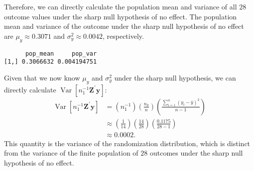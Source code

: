 \documentclass[
  12pt,
  leqno]{article}
\newenvironment{Shaded}{\begin{snugshade}}{\end{snugshade}}
\newcommand{\DecValTok}[1]{\textcolor[rgb]{0.00,0.00,0.81}{#1}}
\newcommand{\KeywordTok}[1]{\textcolor[rgb]{0.13,0.29,0.53}{\textbf{#1}}}
\newcommand{\NormalTok}[1]{#1}
\newcommand{\OperatorTok}[1]{\textcolor[rgb]{0.81,0.36,0.00}{\textbf{#1}}}
\newcommand{\StringTok}[1]{\textcolor[rgb]{0.31,0.60,0.02}{#1}}
\DeclareMathOperator{\Var}{\mathrm{Var}}
\DeclareMathOperator{\1}{\mathbbm{1}}
\begin{document}
Therefore, we can directly calculate the population mean and variance of
all \(28\) outcome values under the sharp null hypothesis of no effect.
The population mean and variance of the outcome under the sharp null
hypothesis of no effect are \(\mu_{y} \approx 0.3071\) and
\(\sigma^2_{y} \approx 0.0042\), respectively.

\scriptsize

\begin{Shaded}
\end{Shaded}

\begin{verbatim}
      pop_mean     pop_var
[1,] 0.3066632 0.004194751
\end{verbatim}

\normalsize

Given that we now know \(\mu_{y}\) and \(\sigma^2_{y}\) under the sharp
null hypothesis, we can directly calculate
\(\Var\left[n_1^{-1} \mathbf{Z}^{\prime} \mathbf{y}\right]\):
\begin{align*}
\Var\left[n_1^{-1} \mathbf{Z}^{\prime} \mathbf{y}\right] & = \left(n_1^{-1}\right) \left(\frac{n_0}{n}\right) \left(\frac{\sum \limits_{i = 1}^n \left(y_i - \bar{y}\right)^2}{n - 1}\right) \\
& \approx \left(\frac{1}{14}\right) \left(\frac{14}{28}\right) \left(\frac{0.1175}{28 - 1}\right) \\
& \approx 0.0002.
\end{align*} This quantity is the variance of the randomization
distribution, which is distinct from the variance of the finite
population of \(28\) outcomes under the sharp null hypothesis of no
effect.

\scriptsize
\end{document}
